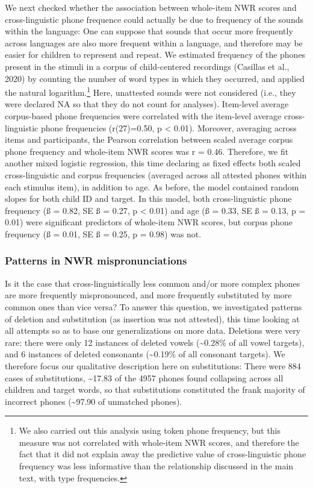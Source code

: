 \documentclass[english,,man,floatsintext]{apa6}
\begin{document}
We next checked whether the association between whole-item NWR scores and cross-linguistic phone frequence could actually be due to frequency of the sounds within the language: One can suppose that sounds that occur more frequently across languages are also more frequent within a language, and therefore may be easier for children to represent and repeat. We estimated frequency of the phones present in the stimuli in a corpus of child-centered recordings (Casillas et al., 2020) by counting the number of word types in which they occurred, and applied the natural logarithm.\footnote{We also carried out this analysis using token phone frequency, but this measure was not correlated with whole-item NWR scores, and therefore the fact that it did not explain away the predictive value of cross-linguistic phone frequency was less informative than the relationship discussed in the main text, with type frequencies.} Here, unattested sounds were not considered (i.e., they were declared NA so that they do not count for analyses). Item-level average corpus-based phone frequencies were correlated with the item-level average cross-linguistic phone frequencies (r(27)=0.50, p \textless{} 0.01). Moreover, averaging across items and participants, the Pearson correlation between scaled average corpus phone frequency and whole-item NWR scores was r = 0.46. Therefore, we fit another mixed logistic regression, this time declaring as fixed effects both scaled cross-linguistic and corpus frequencies (averaged across all attested phones within each stimulus item), in addition to age. As before, the model contained random slopes for both child ID and target. In this model, both cross-linguistic phone frequency (ß = 0.82, SE ß = 0.27, p \textless{} 0.01) and age (ß = 0.33, SE ß = 0.13, p = 0.01) were significant predictors of whole-item NWR scores, but corpus phone frequency (ß = 0.01, SE ß = 0.25, p = 0.98) was not.

\hypertarget{patterns-in-nwr-mispronunciations}{%
\subsubsection{Patterns in NWR mispronunciations}\label{patterns-in-nwr-mispronunciations}}

Is it the case that cross-linguistically less common and/or more complex phones are more frequently mispronounced, and more frequently substituted by more common ones than vice versa? To answer this question, we investigated patterns of deletion and substitution (as insertion was not attested), this time looking at all attempts so as to base our generalizations on more data. Deletions were very rare: there were only 12 instances of deleted vowels (\textasciitilde{}0.28\% of all vowel targets), and 6 instances of deleted consonants (\textasciitilde{}0.19\% of all consonant targets). We therefore focus our qualitative description here on substitutions: There were 884 cases of substitutions, \textasciitilde{}17.83 of the 4957 phones found collapsing across all children and target words, so that substitutions constituted the frank majority of incorrect phones (\textasciitilde{}97.90 of unmatched phones).
\end{document}
